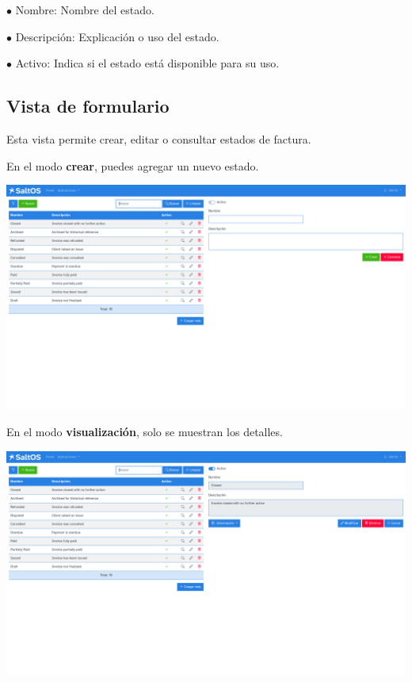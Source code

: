 \documentclass[a4paper]{article}
\begin{document}
\begin{compactitem}
\item[\color{myblue}$\bullet$] Nombre: Nombre del estado.
\item[\color{myblue}$\bullet$] Descripción: Explicación o uso del estado.
\item[\color{myblue}$\bullet$] Activo: Indica si el estado está disponible para su uso.
\end{compactitem}

\hypertarget{toc144}{}
\subsection{Vista de formulario}

Esta vista permite crear, editar o consultar estados de factura.

En el modo \textbf{crear}, puedes agregar un nuevo estado.

\begin{center}\includegraphics[width=1\textwidth]{../ujest/snaps/test-screenshots-js-screenshots-sales-invoices-status-create-es-es-1-snap.png}\end{center}

En el modo \textbf{visualización}, solo se muestran los detalles.

\begin{center}\includegraphics[width=1\textwidth]{../ujest/snaps/test-screenshots-js-screenshots-sales-invoices-status-view-10-es-es-1-snap.png}\end{center}
\end{document}
